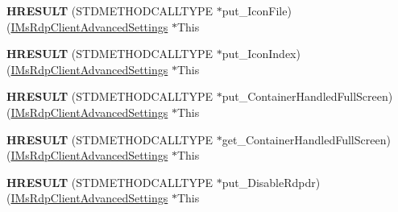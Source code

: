 \begin{DoxyCompactItemize}
\item 
\mbox{\label{struct_m_s_t_s_c_lib_1_1_i_ms_rdp_client_advanced_settings_vtbl_ad54d4d5bb037b0f7c82d873c7d957296}} 
{\bfseries H\+R\+E\+S\+U\+LT} (S\+T\+D\+M\+E\+T\+H\+O\+D\+C\+A\+L\+L\+T\+Y\+PE $\ast$put\+\_\+\+Icon\+File)(\hyperlink{interface_m_s_t_s_c_lib_1_1_i_ms_rdp_client_advanced_settings}{I\+Ms\+Rdp\+Client\+Advanced\+Settings} $\ast$This
\item 
\mbox{\label{struct_m_s_t_s_c_lib_1_1_i_ms_rdp_client_advanced_settings_vtbl_a944dfd5a615d6ad9f12cf7374b1e9422}} 
{\bfseries H\+R\+E\+S\+U\+LT} (S\+T\+D\+M\+E\+T\+H\+O\+D\+C\+A\+L\+L\+T\+Y\+PE $\ast$put\+\_\+\+Icon\+Index)(\hyperlink{interface_m_s_t_s_c_lib_1_1_i_ms_rdp_client_advanced_settings}{I\+Ms\+Rdp\+Client\+Advanced\+Settings} $\ast$This
\item 
\mbox{\label{struct_m_s_t_s_c_lib_1_1_i_ms_rdp_client_advanced_settings_vtbl_a5bef43057eb297bccfe133abc57b4051}} 
{\bfseries H\+R\+E\+S\+U\+LT} (S\+T\+D\+M\+E\+T\+H\+O\+D\+C\+A\+L\+L\+T\+Y\+PE $\ast$put\+\_\+\+Container\+Handled\+Full\+Screen)(\hyperlink{interface_m_s_t_s_c_lib_1_1_i_ms_rdp_client_advanced_settings}{I\+Ms\+Rdp\+Client\+Advanced\+Settings} $\ast$This
\item 
\mbox{\label{struct_m_s_t_s_c_lib_1_1_i_ms_rdp_client_advanced_settings_vtbl_ae7c2c989889e14d43535b0180f4ede2d}} 
{\bfseries H\+R\+E\+S\+U\+LT} (S\+T\+D\+M\+E\+T\+H\+O\+D\+C\+A\+L\+L\+T\+Y\+PE $\ast$get\+\_\+\+Container\+Handled\+Full\+Screen)(\hyperlink{interface_m_s_t_s_c_lib_1_1_i_ms_rdp_client_advanced_settings}{I\+Ms\+Rdp\+Client\+Advanced\+Settings} $\ast$This
\item 
\mbox{\label{struct_m_s_t_s_c_lib_1_1_i_ms_rdp_client_advanced_settings_vtbl_a50e968c7ee346d8793bbf576ff5a882e}} 
{\bfseries H\+R\+E\+S\+U\+LT} (S\+T\+D\+M\+E\+T\+H\+O\+D\+C\+A\+L\+L\+T\+Y\+PE $\ast$put\+\_\+\+Disable\+Rdpdr)(\hyperlink{interface_m_s_t_s_c_lib_1_1_i_ms_rdp_client_advanced_settings}{I\+Ms\+Rdp\+Client\+Advanced\+Settings} $\ast$This
\item 

\end{DoxyCompactItemize}

